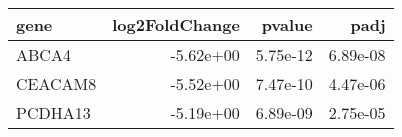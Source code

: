 \begin{tabular}{lrrr}
\toprule
   gene &  log2FoldChange &   pvalue &     padj \\
\midrule
  ABCA4 &       -5.62e+00 & 5.75e-12 & 6.89e-08 \\
CEACAM8 &       -5.52e+00 & 7.47e-10 & 4.47e-06 \\
PCDHA13 &       -5.19e+00 & 6.89e-09 & 2.75e-05 \\
\bottomrule
\end{tabular}
